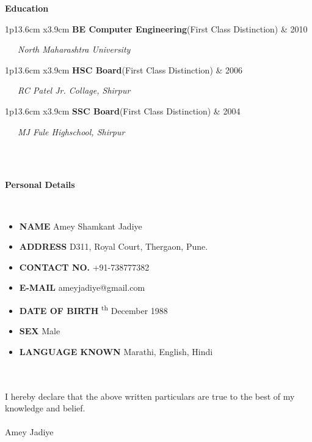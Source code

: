 \documentclass[10pt,A4]{article}
\newcommand{\cvsection}[1]
{
	\begin{center}
		\large\textcolor{sectcol}{\textbf{#1}}
	\end{center}
}
\newcommand{\cvedu}[3]
{

\begin{tabular*}{1\textwidth}{p{13.6cm}  x{3.9cm}}
	\textbf{#2}\tab \small{(First Class Distinction)} & \tab\textcolor{sectcol}{#1} 
\end{tabular*}

	\vspace{-1pt}
	\ \ \ \textcolor{bgcol}{\small{\textit{#3}}}
	\ \ \ \vspace{10pt}

}
\newcommand{\mystrut}{\rule[-.3\baselineskip]{0pt}{\baselineskip}}
\begin{document}
\cvsection{Education}

\cvedu{2010}{BE Computer Engineering}{North Maharashtra University}


%
\cvedu{2006}{HSC Board}{RC Patel Jr. Collage, Shirpur}


%
\cvedu{2004}{SSC Board}{MJ Fule Highschool, Shirpur}

\ \\ \\

\cvsection{Personal Details}

\ \\
\begin{itemize}

\item \textbf{NAME} \tab Amey Shamkant Jadiye
\item \textbf{ADDRESS} \tab D311, Royal Court, Thergaon, Pune.
\item \textbf{CONTACT NO.} \tab +91-738777382
\item \textbf{E-MAIL} \tab ameyjadiye@gmail.com
\item \textbf{DATE OF BIRTH} \textsuperscript{th} December 1988
\item \textbf{SEX} \tab Male
\item \textbf{LANGUAGE KNOWN} \tab Marathi, English, Hindi

\end{itemize}

\ \\ \\
I hereby declare that the above written particulars are true to the best of my
knowledge and belief.
\\ \\
Amey Jadiye




\null
\vspace*{\fill}
\hspace{-0.25\linewidth}\colorbox{white}{\makebox[1.5\linewidth][c]{\mystrut  \textnormal{\textcolor{sectcol}{www.codeinventory.com} $|$ \textcolor{sectcol}{github.com/ameyjadiye}}}}


%
%
%
%
%
%
\end{document}

